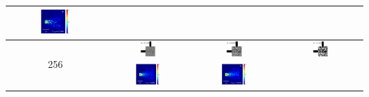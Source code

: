 \begin{table}[ht]
\begin{tabular}{|c|c|c|c|}
      \includegraphics[width=0.33\textwidth]{image/results/bend/MMA/visualize_field_fab_128.png} \\
    \hline
      \multirow{2}{*}{256} &
      \includegraphics[width=0.20\textwidth]{image/results/bend/MMA/visualize_eps_cont_256.png} &
      \includegraphics[width=0.20\textwidth]{image/results/bend/MMA/visualize_eps_disc_256.png} &
      \includegraphics[width=0.20\textwidth]{image/results/bend/MMA/visualize_eps_fab_256.png} \\
      \cline{2-4}
      &
      \includegraphics[width=0.33\textwidth]{image/results/bend/MMA/visualize_field_cont_256.png} &
      \includegraphics[width=0.33\textwidth]{image/results/bend/MMA/visualize_field_disc_256.png} &

\end{tabular}
\end{table}
